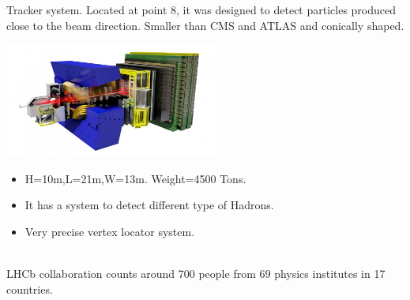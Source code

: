\documentclass[8pt]{beamer}
\begin{document}
\begin{frame}[fragile]{Tracker system.}
	Located at point 8, it was designed to detect particles produced close to the beam direction.
	Smaller than CMS and ATLAS and conically shaped.
	
	\vspace{0.5cm}
	\begin{minipage}{0.7\textwidth}%
		\includegraphics[width=7cm]{8}
	\end{minipage}%
	\hfill%
	\begin{minipage}{0.3\textwidth}\raggedleft
		\begin{itemize}
			\item H=10m,L=21m,W=13m. Weight=4500 Tons.		
			\item It has a system to detect different type of Hadrons.
			\item Very precise vertex locator system.
			
		\end{itemize}
	\end{minipage}
	\\
	\vspace{0.5cm}
	LHCb collaboration counts around 700 people from 69 physics institutes in 17 countries.
\end{frame}

\end{document}
